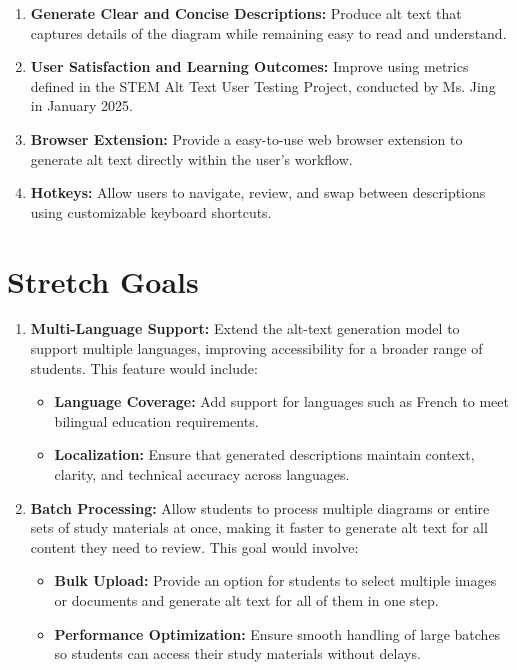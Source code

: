 \documentclass{article}
\begin{document}
\begin{enumerate}
    \item \textbf{Generate Clear and Concise Descriptions:} Produce alt text that captures details of the diagram while remaining easy to read and understand.
    \item \textbf{User Satisfaction and Learning Outcomes:} Improve using metrics defined in the STEM Alt Text User Testing Project, conducted by Ms. Jing in January 2025.
    \item \textbf{Browser Extension:} Provide a easy-to-use web browser extension to generate alt text directly within the user's workflow.
    \item \textbf{Hotkeys:} Allow users to navigate, review, and swap between descriptions using customizable keyboard shortcuts.
\end{enumerate}


\section{Stretch Goals}

\begin{enumerate}
    \item \textbf{Multi-Language Support:}  
    Extend the alt-text generation model to support multiple languages, improving accessibility for a broader range of students. This feature would include:
    \begin{itemize}
        \item \textbf{Language Coverage:} Add support for languages such as French to meet bilingual education requirements.
        \item \textbf{Localization:} Ensure that generated descriptions maintain context, clarity, and technical accuracy across languages.
    \end{itemize}

    \item \textbf{Batch Processing:}  
    Allow students to process multiple diagrams or entire sets of study materials at once, making it faster to generate alt text for all content they need to review. This goal would involve:
    \begin{itemize}
        \item \textbf{Bulk Upload:} Provide an option for students to select multiple images or documents and generate alt text for all of them in one step.
        \item \textbf{Performance Optimization:} Ensure smooth handling of large batches so students can access their study materials without delays.
    \end{itemize}

\end{enumerate}
\end{document}
